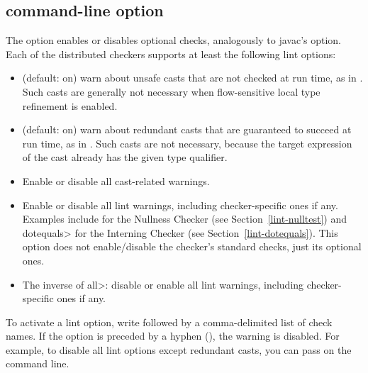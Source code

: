 \subsection{ command-line option\label{alint}}

\label{lint-options}

The  option enables or disables optional checks, analogously to
javac's  option.
Each of the distributed checkers supports at least the following lint options:

\begin{itemize}

\item
   (default: on) warn about unsafe casts that are not
  checked at run time, as in .  Such casts
  are generally not necessary when flow-sensitive local type refinement is
  enabled.

\item
   (default: on) warn about redundant
  casts that are guaranteed to succeed at run time,
  as in .  Such casts are not necessary,
  because the target expression of the cast already has the given type
  qualifier.

\item
   Enable or disable all cast-related warnings.

\item
   Enable or disable all lint warnings, including
  checker-specific ones if any.  Examples include  for the
  Nullness Checker (see Section~\ref{lint-nulltest}) and \<dotequals> for
  the Interning Checker (see Section~\ref{lint-dotequals}).  This option
  does not enable/disable the checker's standard checks, just its optional
  ones.

\item
   The inverse of \<all>:  disable or enable all lint warnings,
  including checker-specific ones if any.

\end{itemize}


\noindent
To activate a lint option, write  followed by a
comma-delimited list of check names.  If the option is preceded by a
hyphen (\code{-}), the warning is disabled.  For example, to disable all
lint options except redundant casts, you can pass
 on the command line.


